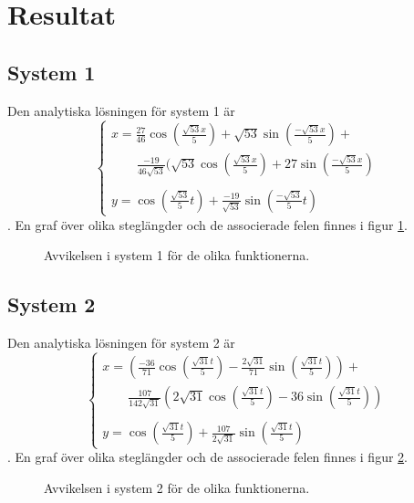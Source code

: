 \section{Resultat}
\subsection{System 1}
Den analytiska lösningen för system 1 är
\begin{equation*}
    \begin{cases}
        x=\frac{27}{46}\cos(\frac{\sqrt{53}x}{5})+\sqrt{53}\sin(\frac{-\sqrt{53}x}{5})+\\
        \qquad\frac{-19}{46\sqrt{53}}(\sqrt{53}\cos(\frac{\sqrt{53}x}{5})+27\sin(\frac{-\sqrt{53}x}{5})\\
        \\[-7.5pt]
        y=\cos(\frac{\sqrt{53}}{5}t)+\frac{-19}{\sqrt{53}}\sin(\frac{-\sqrt{53}}{5}t)
    \end{cases}
\end{equation*}. En graf över olika steglängder och de associerade felen finnes i figur \ref{fig:diagram_sys_1_errors}.

\begin{figure}[h!]
    \centering
    
    \caption{Avvikelsen i system 1 för de olika funktionerna.}
    \label{fig:diagram_sys_1_errors}
\end{figure}

\subsection{System 2}
Den analytiska lösningen för system 2 är
\begin{equation*}
    \begin{cases}
        x=(\frac{-36}{71}\cos(\frac{\sqrt{31}t}{5})-\frac{2\sqrt{31}}{71}\sin(\frac{\sqrt{31}t}{5}))+\\
        \qquad \frac{107}{142\sqrt{31}}(2\sqrt{31}\cos(\frac{\sqrt{31}t}{5})-36\sin(\frac{\sqrt{31}t}{5}))\\
        \\[-7.5pt]
        y=\cos({\frac{\sqrt{31}t}{5}})+\frac{107}{2\sqrt{31}}\sin(\frac{\sqrt{31}t}{5})
    \end{cases}
\end{equation*}. En graf över olika steglängder och de associerade felen finnes i figur \ref{fig:diagram_sys_2_errors}.

\begin{figure}[h!]
    \centering
    
    \caption{Avvikelsen i system 2 för de olika funktionerna.}
    \label{fig:diagram_sys_2_errors}
\end{figure}

